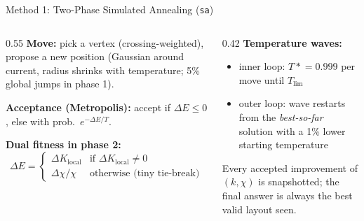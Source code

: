 \begin{frame}{Method 1: Two-Phase Simulated Annealing (\texttt{sa})}
  \begin{columns}[T]
    \begin{column}{0.55\textwidth}
      \textbf{Move:} pick a vertex (crossing-weighted), propose a new position
      (Gaussian around current, radius shrinks with temperature; 5\% global jumps in phase 1).
      \medskip

      \textbf{Acceptance (Metropolis):} accept if $\Delta E\le 0$, else with prob.\ $e^{-\Delta E/T}$.
      \medskip

      \textbf{Dual fitness in phase 2:}
      \[
        \Delta E =
        \begin{cases}
          \Delta K_{\text{local}} & \text{if } \Delta K_{\text{local}}\neq 0\\[2pt]
          \Delta\chi / \chi & \text{otherwise (tiny tie-break)}
        \end{cases}
      \]
    \end{column}
    \begin{column}{0.42\textwidth}
      \textbf{Temperature waves:}
      \begin{itemize}
        \item inner loop: $T \mathrel{*}= 0.999$ per move until $T_{\lim}$
        \item outer loop: wave restarts from the \emph{best-so-far} solution
              with a 1\% lower starting temperature
      \end{itemize}
      \medskip
      Every accepted improvement of $(k,\chi)$ is snapshotted; the final answer
      is always the best valid layout seen.
    \end{column}
  \end{columns}
\end{frame}

